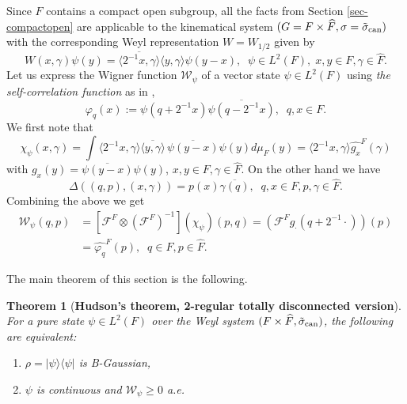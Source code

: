 \documentclass[12pt,reqno]{amsart}
\newtheorem{thm}{Theorem}
\theoremstyle{definition}
\theoremstyle{definition}
\theoremstyle{definition}
\numberwithin{thm}{section}
\numberwithin{equation}{section}
\newcommand{\la}{\langle}
\newcommand{\ra}{\rangle}
\newcommand{\z}{\mathbb{Z}}
\newcommand{\wh}[1]{\widehat{#1}}
\newcommand{\bQ}{\mathbb{Q}}
\begin{document}
Since $F$ contains a compact open subgroup, all the facts from Section \ref{sec-compactopen} are applicable to the kinematical system $(G=F\times \widehat{F}, \sigma=\tilde{\sigma}_{\rm can})$ with the corresponding Weyl representation $W=W_{1/2}$ given by
    $$W(x,\gamma)\psi(y)= \overline{\la 2^{-1}x,\gamma \ra} \la y, \gamma\ra \psi(y-x),\;\; \psi\in L^2(F), \; x, y\in F, \gamma \in \wh{F}.$$
Let us express the Wigner function $\mathcal{W}_{\psi}$ of a vector state $\psi\in L^2(F)$ using {\em the self-correlation function} as in \cite[p.10]{Gro},
    $$\varphi_q(x):=\psi(q+2^{-1}x)\overline{\psi(q-2^{-1}x)},\;\; q,x\in F.$$
We first note that
    $$\chi_{\psi}(x,\gamma)=\int \la 2^{-1}x,\gamma\ra \overline{\la y,\gamma \ra}\,\overline{\psi(y-x)}\psi(y)d\mu_F(y)=\la 2^{-1}x,\gamma \ra \wh{g_x}^F(\gamma)$$
with $g_x(y)=\overline{\psi(y-x)}\psi(y)$, $x, y\in F, \gamma \in \wh{F}$. On the other hand we have
    $$\Delta((q,p),(x,\gamma)) = p(x)\overline{\gamma(q)},\;\; q,x\in F, p,\gamma \in \wh{F}.$$
Combining the above we get
\begin{align} \label{eq-totdisconn-Wigner}
    \mathcal{W}_{\psi}(q,p)&=\left[\mathcal{F}^F\otimes (\mathcal{F}^{F})^{-1}\right](\chi_{\psi})(p,q)
    =(\mathcal{F}^F g_{\cdot}(q+2^{-1}\cdot))(p)\nonumber\\
    & = \wh{\varphi_q}^F(p),\;\; q\in F, p \in \wh{F}.
\end{align}

The main theorem of this section is the following.

\begin{thm}[\textbf{Hudson's theorem, 2-regular totally disconnected version}]\label{thm-Hudson-totdisconn}
For a pure state $\psi\in L^2(F)$ over the Weyl system $(F\times \widehat{F}, \tilde{\sigma}_{\rm can})$, the following are equivalent:
\begin{enumerate}
    \item $\rho=|\psi\ra\la \psi|$ is B-Gaussian,
    
    \item $\psi$ is continuous and $\mathcal{W}_{\psi}\geq 0$ a.e.
\end{enumerate}
\end{thm}

\end{document}
